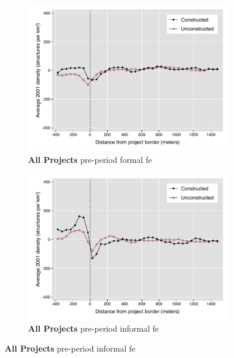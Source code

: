 \documentclass[12pt]{article}
\begin{document}
\begin{figure}
        \centering
        \begin{subfigure}[b]{0.48\textwidth}
                    \caption[Network2]%
            {{\footnotesize \textbf{All Projects} pre-period formal fe}}    
            \label{fig:prefor}
            \centering
            \includegraphics[width=\textwidth,trim={0.3cm .3cm 0.1cm 0cm}, clip=true]{figures/bblu_for_fe_pre_means_4_sp_postk.pdf}

        \end{subfigure}
        \hfill
        \begin{subfigure}[b]{0.48\textwidth}  
                    \caption[]%
            {{\footnotesize \textbf{All Projects} pre-period informal fe }}      
            \label{fig:preinf}
            \centering 
            \includegraphics[width=\textwidth,trim={0.3cm .3cm 0.1cm 0cm}, clip=true]{figures/bblu_inf_fe_pre_means_4_sp_postk.pdf}


\end{subfigure}
\end{figure}
\end{document}
